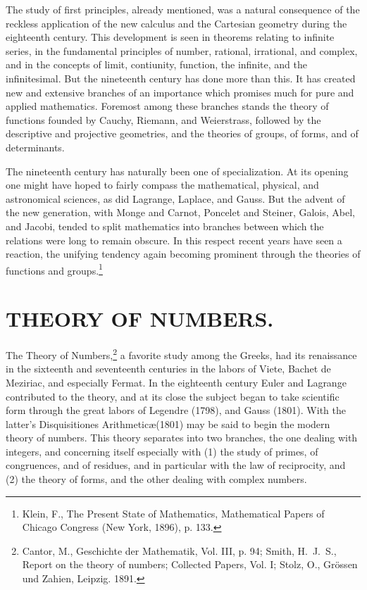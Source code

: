\documentclass[oneside]{book}
\begin{document}
The study of first principles, already mentioned, was a natural
consequence of the reckless application of the new calculus and the
Cartesian geometry during the eighteenth century. This development
is seen in theorems relating to infinite series, in the fundamental
principles of number, rational, irrational, and complex, and in the
concepts of limit, contiunity, function, the infinite, and the
infinitesimal. But the nineteenth century has done more than
this. It has created new and extensive branches of an importance
which promises much for pure and applied mathematics. Foremost among
these branches stands the theory of functions founded by Cauchy,
Riemann, and Weierstrass, followed by the descriptive and
projective geometries, and the theories of groups, of forms, and of
determinants.

The nineteenth century has naturally been one of specialization. At
its opening one might have hoped to fairly compass the mathematical,
physical, and astronomical sciences, as did Lagrange, Laplace, and
Gauss. But the advent of the new generation, with Monge and Carnot,
Poncelet and Steiner, Galois, Abel, and Jacobi, tended to split
mathematics into branches between which the relations were long to
remain obscure. In this respect recent years have seen a reaction,
the unifying tendency again becoming prominent through the theories
of functions and groups.\footnote{Klein, F., The Present State of
Mathematics, Mathematical Papers of Chicago Congress (New York,
1896), p. 133.}

\chapter{THEORY OF NUMBERS.}

The Theory of Numbers,\footnote{Cantor, M., Geschichte der
Mathematik, Vol. III, p. 94; Smith, H.~J.~S., Report on the theory
of numbers; Collected Papers, Vol. I; Stolz, O., Gr\"ossen und
Zahien, Leipzig. 1891.} a favorite study among the Greeks, had its
renaissance in the sixteenth and seventeenth centuries in the labors
of Viete, Bachet de Meziriac, and especially Fermat. In the
eighteenth century Euler and Lagrange contributed to the theory, and
at its close the subject began to take scientific form through the
great labors of Legendre (1798), and Gauss (1801). With the latter's
Disquisitiones Arithmetic\ae (1801) may be said to begin the modern
theory of numbers. This theory separates into two branches, the one
dealing with integers, and concerning itself especially with (1) the
study of primes, of congruences, and of residues, and in particular
with the law of reciprocity, and (2) the theory of forms, and the
other dealing with complex numbers.
\end{document}
